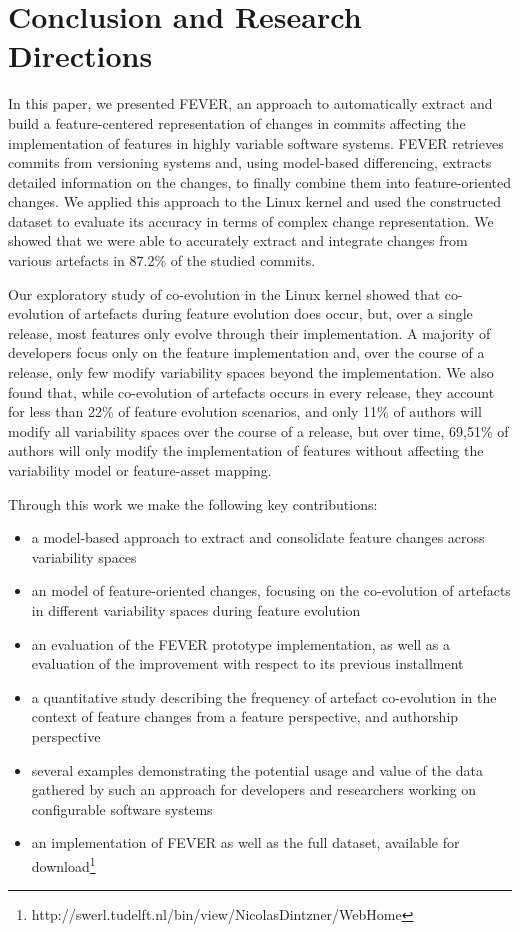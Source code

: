 \section{Conclusion and Research Directions}
\label{sec:conclusion}

In this paper, we presented FEVER, an approach to automatically extract and build a feature-centered representation of changes
in commits affecting the implementation of features in highly variable software systems. 
FEVER retrieves commits from versioning systems and, using model-based differencing, 
extracts detailed information on the changes, to finally combine them into feature-oriented changes. 
We applied this approach to the Linux kernel and used the constructed dataset to evaluate its accuracy 
in terms of complex change representation.
We showed that we were able to accurately extract and integrate changes from various artefacts in 87.2\%  of the studied commits.

Our exploratory study of co-evolution in the Linux kernel showed that  co-evolution of artefacts during feature evolution does occur, 
but, over a single release, most features
only evolve through their implementation. A majority of developers focus only on the feature implementation
and, over the course of a release, only few modify variability spaces beyond the implementation.
We also found that, while co-evolution of artefacts occurs in every release, they account for less than 22\% of feature evolution scenarios,
and only 11\% of authors will modify all variability spaces over the course of a release, but over time, 69,51\% of authors will only modify the implementation of features without affecting the variability model or feature-asset mapping.

Through this work we make the following key contributions:
\begin{itemize}
\item a model-based approach to extract and consolidate feature changes across variability spaces
\item an model of feature-oriented changes, focusing on the co-evolution of artefacts in different variability spaces during feature evolution
\item an evaluation of the FEVER prototype implementation, as well as a evaluation of the improvement with respect to its previous installment
\item a quantitative study describing the frequency of artefact co-evolution in the context of feature
changes from a feature perspective, and authorship perspective
\item several examples demonstrating the potential usage and value of the data gathered by such an approach for developers and researchers working
on configurable software systems
\item an implementation of FEVER as well as the full dataset, available for download\footnote{http://swerl.tudelft.nl/bin/view/NicolasDintzner/WebHome}
\end{itemize}


